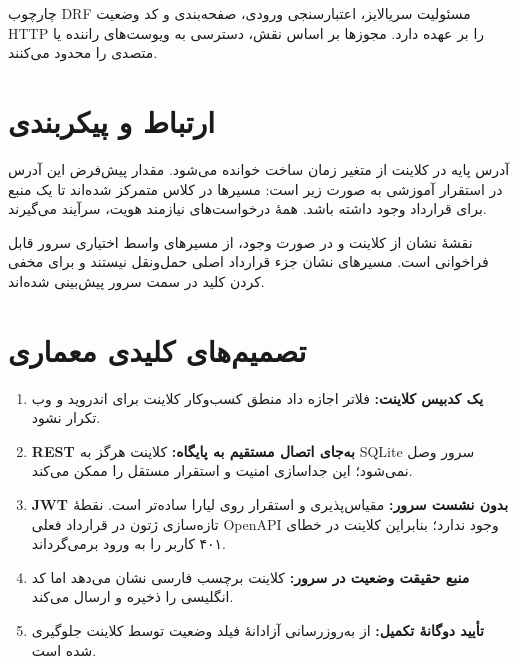 چارچوب \textenglish{DRF} مسئولیت سریالایز، اعتبارسنجی ورودی، صفحه‌بندی و کد وضعیت \textenglish{HTTP} را بر عهده دارد. مجوزها بر اساس نقش، دسترسی به ویوست‌های راننده یا متصدی را محدود می‌کنند.

\section{ارتباط و پیکربندی}

آدرس پایه در کلاینت از متغیر زمان ساخت  خوانده می‌شود. مقدار پیش‌فرض این آدرس در استقرار آموزشی به صورت زیر است:
مسیرها در کلاس  متمرکز شده‌اند تا یک منبع برای قرارداد وجود داشته باشد. همهٔ درخواست‌های نیازمند هویت، سرآیند  می‌گیرند.

نقشهٔ نشان از کلاینت و در صورت وجود، از مسیرهای واسط اختیاری سرور  قابل فراخوانی است. مسیرهای نشان جزء قرارداد اصلی حمل‌ونقل نیستند و برای مخفی کردن کلید در سمت سرور پیش‌بینی شده‌اند.

\section{تصمیم‌های کلیدی معماری}

\begin{enumerate}
  \item \textbf{یک کدبیس کلاینت:} فلاتر اجازه داد منطق کسب‌وکار کلاینت برای اندروید و وب تکرار نشود.
  \item \textbf{REST به‌جای اتصال مستقیم به پایگاه:} کلاینت هرگز به \textenglish{SQLite} سرور وصل نمی‌شود؛ این جداسازی امنیت و استقرار مستقل را ممکن می‌کند.
  \item \textbf{JWT بدون نشست سرور:} مقیاس‌پذیری و استقرار روی لیارا ساده‌تر است. نقطهٔ تازه‌سازی ژتون در قرارداد فعلی \textenglish{OpenAPI} وجود ندارد؛ بنابراین کلاینت در خطای ۴۰۱ کاربر را به ورود برمی‌گرداند.
  \item \textbf{منبع حقیقت وضعیت در سرور:} کلاینت برچسب فارسی نشان می‌دهد اما کد انگلیسی را ذخیره و ارسال می‌کند.
  \item \textbf{تأیید دوگانهٔ تکمیل:} از به‌روزرسانی آزادانهٔ فیلد وضعیت توسط کلاینت جلوگیری شده است.
\end{enumerate}
